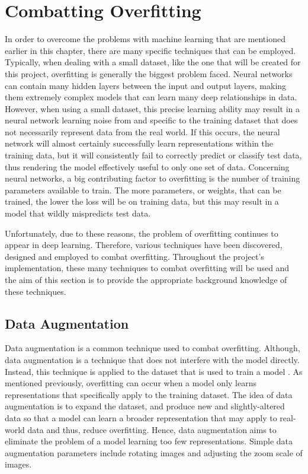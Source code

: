\documentclass{l4proj}
\begin{document}
\section{Combatting Overfitting}
In order to overcome the problems with machine learning that are mentioned earlier in this chapter, there are many specific techniques that can be employed.
Typically, when dealing with a small dataset, like the one that will be created for this project, overfitting is generally the biggest problem faced.
Neural networks can contain many hidden layers between the input and output layers, making them extremely complex models that can learn many deep relationships in data.
However, when using a small dataset, this precise learning ability may result in a neural network learning noise from and specific to the training dataset that does not necessarily represent data from the real world.
If this occurs, the neural network will almost certainly successfully learn representations within the training data, but it will consistently fail to correctly predict or classify test data, thus rendering the model effectively useful to only one set of data.
Concerning neural networks, a big contributing factor to overfitting is the number of training parameters available to train.
The more parameters, or weights, that can be trained, the lower the loss will be on training data, but this may result in a model that wildly mispredicts test data.

Unfortunately, due to these reasons, the problem of overfitting continues to appear in deep learning.
Therefore, various techniques have been discovered, designed and employed to combat overfitting. 
Throughout the project's implementation, these many techniques to combat overfitting will be used and the aim of this section is to provide the appropriate background knowledge of these techniques.

\subsection{Data Augmentation}
Data augmentation is a common technique used to combat overfitting.
Although, data augmentation is a technique that does not interfere with the model directly.
Instead, this technique is applied to the dataset that is used to train a model \cite{Simard:2003:BPC:938980.939477}.
As mentioned previously, overfitting can occur when a model only learns representations that specifically apply to the training dataset.
The idea of data augmentation is to expand the dataset, and produce new and slightly-altered data so that a model can learn a broader representation that may apply to real-world data and thus, reduce overfitting.
Hence, data augmentation aims to eliminate the problem of a model learning too few representations.
Simple data augmentation parameters include rotating images and adjusting the zoom scale of images.
\end{document}

